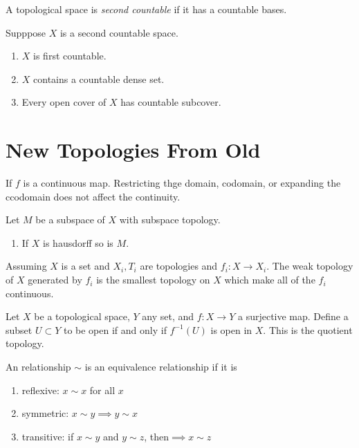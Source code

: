 \documentclass[twocolumn]{article}
\begin{document}
\begin{defi}
	A topological space is \emph{second countable} if it has a countable bases.
\end{defi}

\begin{thm}
	Supppose $X$ is a second countable space.
	\begin{enumerate}
		\item $X$ is first countable.
		\item $X$ contains a countable dense set.
		\item Every open cover of $X$ has countable subcover.
	\end{enumerate}
\end{thm}

\section{New Topologies From Old}

\begin{thm}
	If $f$ is a continuous map. 
	Restricting thge domain, codomain, or expanding the ccodomain does not affect the continuity.
\end{thm}

\begin{example}
	Let $M$ be a subspace of $X$ with subspace topology.
	\begin{enumerate}
		\item If $X$ is hausdorff so is $M$.
	\end{enumerate}
\end{example}

\begin{defi}
	Assuming $X$ is a set and $X_i, T_i$ are topologies and $f_i: X \rightarrow X_i$. 
	The weak topology of $X$ generated by $f_i$ is the smallest topology on $X$ which make all of the $f_i$ continuous.
\end{defi}

\begin{defi}
	Let $X$ be a topological space, $Y$ any set, and $f: X \rightarrow Y$ a surjective map.
	Define a subset $U \subset Y$ to be open if and only if $f^{-1}(U)$ is open in $X$. 
	This is the quotient topology.
\end{defi}

\begin{defi}
	An relationship $\sim$ is an equivalence relationship if it is 
	\begin{enumerate}
		\item reflexive: $x \sim x$ for all $x$
		\item symmetric: $x \sim y \implies y \sim x$
		\item transitive: if $x \sim y $ and $y \sim z$, then$ \implies x \sim z$
	\end{enumerate}
\end{defi}
\end{document}
